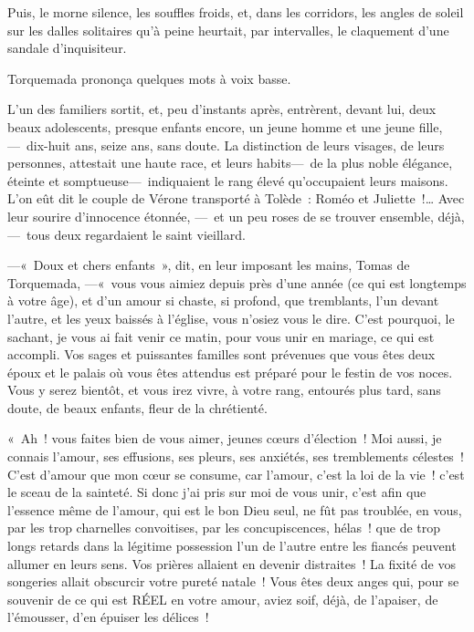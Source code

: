 \documentclass[french,twoside]{book} %
\begin{document}
Puis, le morne silence, les souffles froids, et, dans les corridors, les angles de soleil sur les dalles solitaires qu’à peine heurtait, par intervalles, le claquement d’une sandale d’inquisiteur.\par
   Torquemada prononça quelques mots à voix basse.\par
L’un des familiers sortit, et, peu d’instants après, entrèrent, devant lui, deux beaux adolescents, presque enfants encore, un jeune homme et une jeune fille, — dix-huit ans, seize ans, sans doute. La distinction de leurs visages, de leurs personnes, attestait une haute race, et leurs habits— de la plus noble élégance, éteinte et somptueuse— indiquaient le rang élevé qu’occupaient leurs maisons. L’on eût dit le couple de Vérone transporté à Tolède : Roméo et Juliette !… Avec leur sourire d’innocence étonnée, — et un peu roses de se trouver ensemble, déjà, — tous deux regardaient le saint vieillard.\par
—« Doux et chers enfants », dit, en leur imposant les mains, Tomas de Torquemada, —« vous vous aimiez depuis près d’une année (ce qui est longtemps à votre âge), et d’un amour si chaste, si profond, que tremblants, l’un devant l’autre, et les yeux baissés à l’église, vous n’osiez vous le dire. C’est pourquoi, le sachant, je vous ai fait venir ce matin, pour vous unir en   mariage, ce qui est accompli. Vos sages et puissantes familles sont prévenues que vous êtes deux époux et le palais où vous êtes attendus est préparé pour le festin de vos noces. Vous y serez bientôt, et vous irez vivre, à votre rang, entourés plus tard, sans doute, de beaux enfants, fleur de la chrétienté.\par
« Ah ! vous faites bien de vous aimer, jeunes cœurs d’élection ! Moi aussi, je connais l’amour, ses effusions, ses pleurs, ses anxiétés, ses tremblements célestes ! C’est d’amour que mon cœur se consume, car l’amour, c’est la loi de la vie ! c’est le sceau de la sainteté. Si donc j’ai pris sur moi de vous unir, c’est afin que l’essence même de l’amour, qui est le bon Dieu seul, ne fût pas troublée, en vous, par les trop charnelles convoitises, par les concupiscences, hélas ! que de trop longs retards dans la légitime possession l’un de l’autre entre les fiancés peuvent allumer en leurs sens. Vos prières allaient en devenir distraites ! La fixité de vos songeries allait obscurcir votre pureté natale ! Vous êtes deux anges qui, pour se souvenir de   ce qui est RÉEL en votre amour, aviez soif, déjà, de l’apaiser, de l’émousser, d’en épuiser les délices !\par
\end{document}
